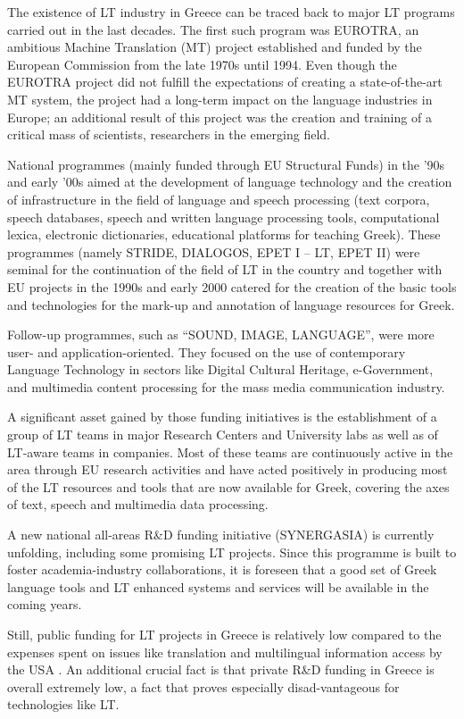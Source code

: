 \begin{multicols}{2}
The existence of LT industry in Greece can be traced back to major LT programs carried out in the last decades. The first such program was EUROTRA, an ambitious Machine Translation (MT) project established and funded by the European Commission from the late 1970s until 1994. Even though the EUROTRA project did not fulfill the expectations of creating a state-of-the-art MT system, the project had a long-term impact on the language industries in Europe; an additional result of this project was the creation and training of a critical mass of scientists, researchers in the emerging field. 

National programmes (mainly funded through EU Structural Funds) in the '90s and early '00s aimed at the development of language technology and the creation of infrastructure in the field of language and speech processing (text corpora, speech databases, speech and written language processing tools, computational lexica, electronic dictionaries, educational platforms for teaching Greek). These programmes (namely STRIDE, DIALOGOS, EPET I – LT, EPET II) were seminal for the continuation of the field of LT in the country and together with EU projects in the 1990s and early 2000 catered for the creation of the basic tools and technologies for the mark-up and annotation of language resources for Greek.

Follow-up programmes, such as “SOUND, IMAGE, LANGUAGE”, were more user- and application-oriented. They focused on the use of contemporary Language Technology in sectors like Digital Cultural Heritage, e-Government, and multimedia content processing for the mass media communication industry.

A significant asset gained by those funding initiatives is the establishment of a group of LT teams in major Research Centers and University labs as well as of LT-aware teams in companies. Most of these teams are continuously active in the area through EU research activities and have acted positively in producing most of the LT resources and tools that are now available for Greek, covering the axes of text, speech and multimedia data processing.

A new national all-areas R\&D funding initiative (SYNERGASIA) is currently unfolding, including some promising LT projects. Since this programme is built to foster academia-industry collaborations, it is foreseen that a good set of Greek language tools and LT enhanced systems and services will be available in the coming years.

Still, public funding for LT projects in Greece is relatively low compared to the expenses spent on issues like translation and multilingual information access by the USA \cite{laz2}. An additional crucial fact is that private R\&D funding in Greece is overall extremely low, a fact that proves especially disad-vantageous for technologies like LT.


\end{multicols}
